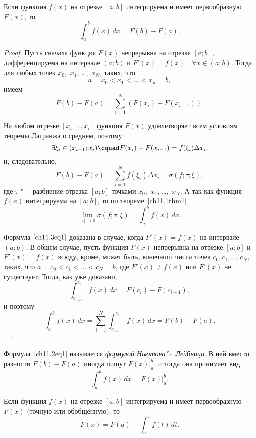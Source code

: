 \begin{thm}
Если функция $f(x)$ на отрезке $[a; b]$ интегрируема и имеет первообразную $F(x)$, то
\begin{equation} \label{ch11.3eq1}
\int_{a}^{b} f(x) \,dx = F(b) - F(a).
\end{equation}
\end{thm}

\begin{proof}
Пусть сначала функция $F(x)$ непрерывна на отрезке $[a;b]$, дифференцируема на интервале $(a;b)$ и $F'(x) = f(x) \quad \forall x \in (a;b)$. Тогда для любых точек $x_0$,~$x_1$, \ldots,~$x_N$, таких, что
$$
a = x_0 < x_1 < \ldots < x_n = b,
$$
имеем
$$
F(b) - F(a) = \sum_{i = 1}^{N} \left( F(x_i) - F(x_{i - 1}) \right).
$$

На любом отрезке $[x_{i - 1}, x_i]$ функция $F(x)$ удовлетворяет всем условиям теоремы Лагранжа о среднем, поэтому
$$
\exists \xi_i \in (x_{i - 1}; x_i) \cquad F(x_i) - F(x_{i - 1}) = f(\xi_i) \Delta x_i,
$$
и, следовательно,
$$
F(b) - F(a) = \sum_{i = 1}^{N} f(\xi_i) \Delta x_i = \sigma(f;\tau;\xi),
$$
где $\tau$ "--- разбиение отрезка $[a;b]$ точками $x_0$,~$x_1$, \ldots,~$x_N$. А так как функция $f(x)$ интегрируема на $[a;b]$, то по теореме~\ref{ch11.1thm1}
$$
\lim_{|\tau| \to 0} \sigma (f;\tau; \xi) = \int_{a}^{b} f(x) \,dx.
$$

Формула $\eqref{ch11.3eq1}$ доказана в случае, когда $F'(x) = f(x)$ на интервале $(a;b)$. В общем случае, пусть функция $F(x)$ непрерывна на отрезке $[a;b]$ и $F'(x) = f(x)$ всюду, кроме, может быть, конечного числа точек $c_0, c_1, \ldots, c_N$, таких, что $a = c_0 < c_1 < \ldots < c_N = b$, где $F'(x) \not= f(x)$ или $F'(x)$ не существует. Тогда, как уже доказано,
$$
\int_{c_{i - 1}}^{c_i} f(x) \,dx = F(c_i) - F(c_{i - 1}),
$$
и поэтому
\begin{equation*}
\int_{a}^{b} f(x) \,dx = \sum_{i = 1}^{N} \int_{c_{i - 1}}^{c_{i}} f(x) \,dx = F(b) - F(a). \tag*{$\qedhere$}
\end{equation*}
\end{proof}


Формула~\eqref{ch11.2eq1} называется \textit{формулой Ньютона"--~Лейбница}. В ней вместо разности $F(b) - F(a)$ иногда пишут $F(x)\big|_{a}^{b}$, и тогда она принимает вид
$$
\int_{a}^{b} f(x) \,dx = F(x)\bigg|_{a}^{b}.
$$

\begin{cons}
Если функция $f(x)$ на отрезке $[a;b]$ интегрируема и имеет первообразную $F(x)$ (точную или обобщённую), то
$$
F(x) = F(a) + \int_{a}^{x} f(t)\,dt.
$$
\end{cons}

